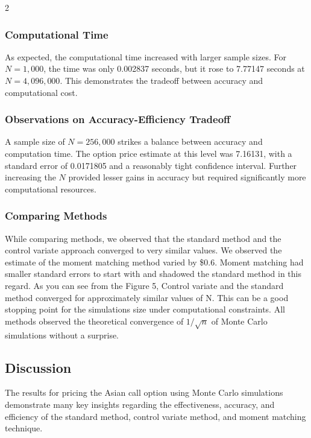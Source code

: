 \begin{multicols}{2}
\subsubsection{Computational Time}
As expected, the computational time increased with larger sample sizes. For \(N = 1,000\), the time was only 0.002837 seconds, but it rose to 7.77147 seconds at \(N = 4,096,000\). This demonstrates the tradeoff between accuracy and computational cost.

\subsubsection{Observations on Accuracy-Efficiency Tradeoff}
A sample size of \(N = 256,000\) strikes a balance between accuracy and computation time. The option price estimate at this level was 7.16131, with a standard error of 0.0171805 and a reasonably tight confidence interval. Further increasing the \(N\) provided lesser gains in accuracy but required significantly more computational resources.

\subsubsection{Comparing Methods}



While comparing methods, we observed that the standard method and the control variate approach converged to very similar values. We observed the estimate of the moment matching method varied by \$0.6. Moment matching had smaller standard errors to start with and shadowed the standard method in this regard. As you can see from the Figure 5, Control variate and the standard method converged for approximately similar values of N. This can be a good stopping point for the simulations size under computational constraints. All methods observed the theoretical convergence of $1/\sqrt{n}$ of Monte Carlo simulations without a surprise.

\subsection{Discussion}

The results for pricing the Asian call option using Monte Carlo simulations demonstrate many key insights regarding the effectiveness, accuracy, and efficiency of the standard method, control variate method, and moment matching technique. 


\end{multicols}
